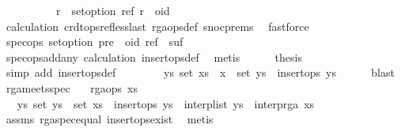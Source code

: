 \begin{isabellebody}
\ \ \isamarkupfalse%
\ {\isacharminus}\isanewline
\ \ \ \ \isamarkupfalse%
\ {\isachardoublequoteopen}{\isasymforall}r\ {\isasymin}\ set{\isacharunderscore}option\ ref{\isachardot}\ r\ {\isacharless}\ oid{\isachardoublequoteclose}\isanewline
\ \ \ \ \ \ \isamarkupfalse%
\ calculation{\isacharparenleft}{}{\isacharparenright}\ crdt{\isacharunderscore}ops{\isacharunderscore}ref{\isacharunderscore}less{\isacharunderscore}last\ rga{\isacharunderscore}ops{\isacharunderscore}def\ snoc{\isachardot}prems\ \isamarkupfalse%
\ fastforce\isanewline
\ \ \ \ \isamarkupfalse%
\ {\isachardoublequoteopen}spec{\isacharunderscore}ops\ set{\isacharunderscore}option\ {\isacharparenleft}pre\ {\isacharat}\ {\isacharbrackleft}{\isacharparenleft}oid{\isacharcomma}\ ref{\isacharparenright}{\isacharbrackright}\ {\isacharat}\ suf{\isacharparenright}{\isachardoublequoteclose}\isanewline
\ \ \ \ \ \ \isamarkupfalse%
\ spec{\isacharunderscore}ops{\isacharunderscore}add{\isacharunderscore}any\ calculation\ insert{\isacharunderscore}ops{\isacharunderscore}def\ \isamarkupfalse%
\ metis\isanewline
\ \ \ \ \isamarkupfalse%
\ {\isacharquery}thesis\ \isamarkupfalse%
\ {\isacharparenleft}simp\ add{\isacharcolon}\ insert{\isacharunderscore}ops{\isacharunderscore}def{\isacharparenright}\isanewline
\ \ \isamarkupfalse%
\isanewline
\ \ \isamarkupfalse%
\ \isamarkupfalse%
\ {\isachardoublequoteopen}{\isasymexists}ys{\isachardot}\ set\ {\isacharparenleft}xs\ {\isacharat}\ {\isacharbrackleft}x{\isacharbrackright}{\isacharparenright}\ {\isacharequal}\ set\ ys\ {\isasymand}\ insert{\isacharunderscore}ops\ ys{\isachardoublequoteclose}\isanewline
\ \ \ \ \isamarkupfalse%
\ blast\isanewline
{}\isamarkupfalse%
%
\endisatagproof
{\isafoldproof}%
%
\isadelimproof
\isanewline
%
\endisadelimproof
\isanewline
{}\isamarkupfalse%
\ rga{\isacharunderscore}meets{\isacharunderscore}spec{\isacharcolon}\isanewline
\ \ \ {\isachardoublequoteopen}rga{\isacharunderscore}ops\ xs{\isachardoublequoteclose}\isanewline
\ \ \ {\isachardoublequoteopen}{\isasymexists}ys{\isachardot}\ set\ ys\ {\isacharequal}\ set\ xs\ {\isasymand}\ insert{\isacharunderscore}ops\ ys\ {\isasymand}\ interp{\isacharunderscore}list\ ys\ {\isacharequal}\ interp{\isacharunderscore}rga\ xs{\isachardoublequoteclose}\isanewline
%
\isadelimproof
\ \ %
\endisadelimproof
%
\isatagproof
{}\isamarkupfalse%
\ assms\ rga{\isacharunderscore}spec{\isacharunderscore}equal\ insert{\isacharunderscore}ops{\isacharunderscore}exist\ \isamarkupfalse%
\ metis%
\endisatagproof
{\isafoldproof}%
%
\isadelimproof
\isanewline
%
\endisadelimproof
%
\isadelimtheory
\isanewline
%
\endisadelimtheory
%
\isatagtheory
{}\isamarkupfalse%
%
\endisatagtheory
{\isafoldtheory}%
%
\isadelimtheory
%
\endisadelimtheory
%
\end{isabellebody}%
